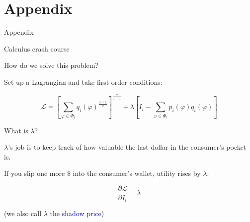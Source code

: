 \documentclass[notes,11pt, aspectratio=169, xcolor=table]{beamer}
\newcommand{\blue}[1]{\textcolor{blue}{#1}}
\newenvironment{wideitemize}{\itemize\addtolength{\itemsep}{10pt}}{\enditemize}
\begin{document}
\section{Appendix}

\begin{frame}
    \Huge Appendix
\end{frame}


\begin{frame}{Calculus crash course}

\begin{wideitemize}
    \item How do we solve this problem? 
    \item<2-> Set up a Lagrangian and take first order conditions:

    \begin{equation*}
    \mathcal{L} = \left[ \sum_{\varphi \in \Phi_i } q_i(
    \varphi)^{\tfrac{\sigma-1}{\sigma}} \right]^{\tfrac{\sigma}{\sigma-1} } + \lambda \left[ I_i - \sum_{\varphi \in \Phi_i } p_i(\varphi) q_i(\varphi) \right]
\end{equation*}

    \item<3-> What is $\lambda$?

    \item<4-> $\lambda$'s job is to keep track of how valuable the last dollar in the consumer’s pocket is.
    
    \item<5-> If you slip one more \$ into the consumer’s wallet, utility rises by $\lambda$:

    \begin{equation*}
        \frac{\partial \mathcal{L}}{\partial I_i} = \lambda
    \end{equation*}

    \qquad (we also call $\lambda$ the \blue{shadow price}) 
    
\end{wideitemize}
    
\end{frame}
\end{document}
